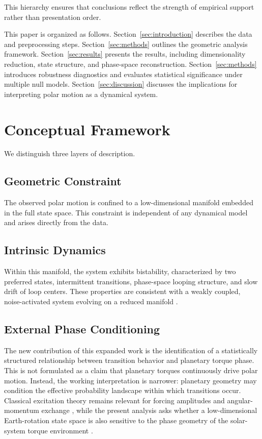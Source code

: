 \documentclass[twocolumn,9pt]{revtex4-2}
\begin{document}
This hierarchy ensures that conclusions reflect the strength of empirical support rather than presentation order.

This paper is organized as follows. Section~\ref{sec:introduction} describes the data and preprocessing steps. Section~\ref{sec:methods} outlines the geometric analysis framework. Section~\ref{sec:results} presents the results, including dimensionality reduction, state structure, and phase-space reconstruction. Section~\ref{sec:methods} introduces robustness diagnostics and evaluates statistical significance under multiple null models. Section~\ref{sec:discussion} discusses the implications for interpreting polar motion as a dynamical system.



\section{Conceptual Framework}
\label{sec:conceptual_framework}

We distinguish three layers of description.

\subsection{Geometric Constraint}
\label{subsec:geometric_constraint}

The observed polar motion is confined to a low-dimensional manifold embedded in the full state space. This constraint is independent of any dynamical model and arises directly from the data.

\subsection{Intrinsic Dynamics}
\label{subsec:intrinsic_dynamics}

Within this manifold, the system exhibits bistability, characterized by two preferred states, intermittent transitions, phase-space looping structure, and slow drift of loop centers. These properties are consistent with a weakly coupled, noise-activated system evolving on a reduced manifold \citep{prigogine1984,kramers1940,risken1989}.

\subsection{External Phase Conditioning}
\label{subsec:external_phase_conditioning}

The new contribution of this expanded work is the identification of a statistically structured relationship between transition behavior and planetary torque phase. This is not formulated as a claim that planetary torques continuously drive polar motion. Instead, the working interpretation is narrower: planetary geometry may condition the effective probability landscape within which transitions occur. Classical excitation theory remains relevant for forcing amplitudes and angular-momentum exchange \citep{munk1960,lambeck1980,dickman2000,gross2007}, while the present analysis asks whether a low-dimensional Earth-rotation state space is also sensitive to the phase geometry of the solar-system torque environment \citep{murraydermott1999}.
\end{document}
